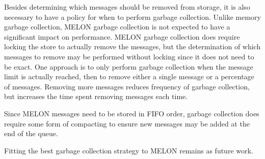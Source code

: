 Besides determining which messages should be removed from storage, it is also necessary to have a policy for when to perform garbage collection. Unlike memory garbage collection, MELON garbage collection is not expected to have a significant impact on performance. MELON garbage collection does require locking the store to actually remove the messages, but the determination of which messages to remove may be performed without locking since it does not need to be exact. One approach is to only perform garbage collection when the message limit is actually reached, then to remove either a single message or a percentage of messages. Removing more messages reduces frequency of garbage collection, but increases the time spent removing messages each time.

Since MELON messages need to be stored in FIFO order, garbage collection does require some form of compacting to ensure new messages may be added at the end of the queue.

Fitting the best garbage collection strategy to MELON remains as future work.
